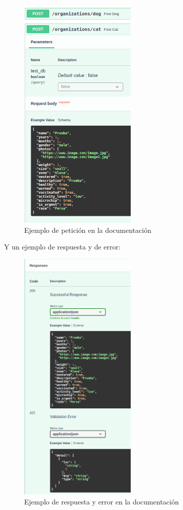 \begin{figure}[H]
    \centering
    \includegraphics[width=0.5\textwidth]{imgs/swagger1.png}
    \caption{Ejemplo de petición en la documentación}
    \label{fig:endpoint-example}
\end{figure}

\newpage

Y un ejemplo de respuesta y de error: \\

\begin{figure}[H]
    \centering
    \includegraphics[width=0.5\textwidth]{imgs/swagger2.png}
    \caption{Ejemplo de respuesta y error en la documentación}
    \label{fig:endpoint-example-2}
\end{figure}

